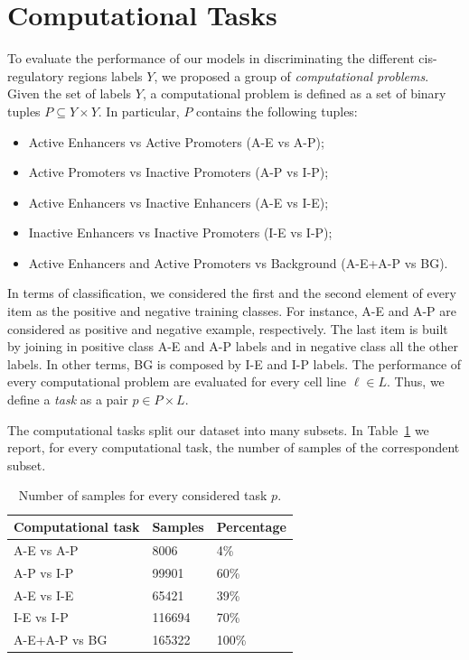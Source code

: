 \section{Computational Tasks} \label{sec:computational_tasks}
To evaluate the performance of our models in discriminating the different cis-regulatory regions labels $Y$, we proposed a group of \emph{computational problems}. Given the set of labels $Y$, a computational problem is defined as a set of binary tuples $P \subseteq Y \times Y$. In particular, $P$ contains the following tuples: 
\begin{itemize}
    \item Active Enhancers vs Active Promoters (A-E vs A-P);
    \item Active Promoters vs Inactive Promoters (A-P vs I-P);
    \item Active Enhancers vs Inactive Enhancers (A-E vs I-E); 
    \item Inactive Enhancers vs Inactive Promoters (I-E vs I-P); 
    \item Active Enhancers and Active Promoters vs Background (A-E+A-P vs BG).
\end{itemize}
In terms of classification, we considered the first and the second element of every item as the positive and negative training classes. For instance, A-E and A-P are considered as positive and negative example, respectively. The last item is built by joining in positive class A-E and A-P labels and in negative class all the other labels. In other terms, BG is composed by I-E and I-P labels. The performance of every computational problem are evaluated for every cell line $\ell \in L$. Thus, we define a \emph{task} as a pair $p \in P \times L$. 

The computational tasks split our dataset into many subsets. In Table~\ref{tab:dataset_sample} we report, for every computational task, the number of samples of the correspondent subset. 

\begin{table}[h]
\centering
\begin{tabular}{lll}
\toprule
Computational task & Samples  & Percentage \\ 
\midrule
A-E vs A-P & 8006   & 4\%  \\ 
A-P vs I-P & 99901 & 60\% \\ 
A-E vs I-E & 65421  & 39\%  \\ 
I-E vs I-P & 116694  & 70\% \\
A-E+A-P vs BG & 165322 & 100\% \\ 
\bottomrule
\end{tabular}
\caption{Number of samples for every considered task $p$.}
\label{tab:dataset_sample}
\end{table}



